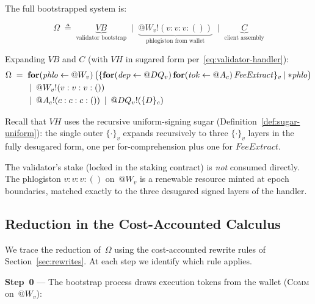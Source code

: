\documentclass[11pt,a4paper]{article}
\makeatletter
\newcommand{\Par}{\mathbin{|}}
\newcommand{\forc}{\mathbf{for}}
\newcommand{\send}[2]{#1 !\!\left( #2 \right)}
\newcommand{\recv}[3]{\forc\!\left( #1 \leftarrow #2 \right) #3}
\newcommand{\drop}[1]{{\ast} #1}
\newcommand{\quot}[1]{@#1}
\newcommand{\signed}[2]{\{#1\}_{#2}}
\makeatother
\begin{document}
The full bootstrapped system is:

\begin{equation}
  \boxed{
    \Omega
    \;\triangleq\;
    \underbrace{
      \mathit{VB}
    }_{\text{validator bootstrap}}
    \;\Par\;
    \underbrace{
      \send{\quot{W_v}}{v : v : v : ()}
    }_{\text{phlogiston from wallet}}
    \;\Par\;
    \underbrace{
      C
    }_{\text{client assembly}}
  }
  \label{eq:full-system}
\end{equation}

\noindent
Expanding $\mathit{VB}$ and $C$ (with $\mathit{VH}$ in
sugared form per~\eqref{eq:validator-handler}):
\begin{align}
  \Omega
  \;=\;\;
  &\recv{\mathit{phlo}}{\quot{W_v}}{
    \bigl(
      \signed{
        \recv{\mathit{dep}}{\quot{DQ_v}}{
          \recv{\mathit{tok}}{\quot{A_c}}{
            \mathit{FeeExtract}
          }
        }
      }{v}
      \Par \drop{\mathit{phlo}}
    \bigr)
  }
  \notag\\
  &\Par\; \send{\quot{W_v}}{v : v : v : ()}
  \notag\\
  &\Par\; \send{\quot{A_c}}{c : c : c : ()}
  \;\Par\;
  \send{\quot{DQ_v}}{\signed{D}{c}}
  \label{eq:full-expanded}
\end{align}

\noindent
Recall that $\mathit{VH}$ uses the recursive uniform-signing
sugar (Definition~\ref{def:sugar-uniform}): the single outer
$\signed{\cdot}{v}$ expands recursively to three
$\signed{\cdot}{v}$ layers in the fully desugared form, one
per for-comprehension plus one for $\mathit{FeeExtract}$.

The validator's stake (locked in the staking contract) is
\emph{not} consumed directly.  The phlogiston
$v : v : v : ()$ on~$\quot{W_v}$ is a renewable resource
minted at epoch boundaries, matched exactly to the three
desugared signed layers of the handler.

\subsection{Reduction in the Cost-Accounted Calculus}
\label{app:ex-reduction-ca}

We trace the reduction of~$\Omega$ using the cost-accounted
rewrite rules of Section~\ref{sec:rewrites}.  At each step
we identify which rule applies.

\bigskip
\noindent
\textbf{Step~0} --- The bootstrap process draws execution
tokens from the wallet (\textsc{Comm} on~$\quot{W_v}$):
\end{document}
